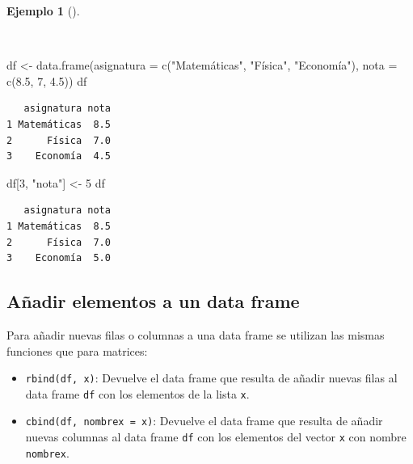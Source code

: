 \documentclass[
  spanish,
  a4paper,
]{scrreport}
\newenvironment{Shaded}{\begin{snugshade}}{\end{snugshade}}
\newcommand{\AttributeTok}[1]{\textcolor[rgb]{0.40,0.45,0.13}{#1}}
\newcommand{\DecValTok}[1]{\textcolor[rgb]{0.68,0.00,0.00}{#1}}
\newcommand{\FloatTok}[1]{\textcolor[rgb]{0.68,0.00,0.00}{#1}}
\newcommand{\FunctionTok}[1]{\textcolor[rgb]{0.28,0.35,0.67}{#1}}
\newcommand{\NormalTok}[1]{\textcolor[rgb]{0.00,0.23,0.31}{#1}}
\newcommand{\OtherTok}[1]{\textcolor[rgb]{0.00,0.23,0.31}{#1}}
\newcommand{\StringTok}[1]{\textcolor[rgb]{0.13,0.47,0.30}{#1}}
\theoremstyle{definition}
\theoremstyle{definition}
\newtheorem{example}{Ejemplo}[chapter]
\theoremstyle{remark}
\begin{document}
\begin{example}[]\protect\hypertarget{exm-modificacion-data-frames}{}\label{exm-modificacion-data-frames}

~

\begin{Shaded}
\begin{Highlighting}[]
\NormalTok{df }\OtherTok{\textless{}{-}} \FunctionTok{data.frame}\NormalTok{(}\AttributeTok{asignatura =} \FunctionTok{c}\NormalTok{(}\StringTok{"Matemáticas"}\NormalTok{, }\StringTok{"Física"}\NormalTok{, }\StringTok{"Economía"}\NormalTok{), }\AttributeTok{nota =} \FunctionTok{c}\NormalTok{(}\FloatTok{8.5}\NormalTok{, }\DecValTok{7}\NormalTok{, }\FloatTok{4.5}\NormalTok{))}
\NormalTok{df}
\end{Highlighting}
\end{Shaded}

\begin{verbatim}
   asignatura nota
1 Matemáticas  8.5
2      Física  7.0
3    Economía  4.5
\end{verbatim}

\begin{Shaded}
\begin{Highlighting}[]
\NormalTok{df[}\DecValTok{3}\NormalTok{, }\StringTok{"nota"}\NormalTok{] }\OtherTok{\textless{}{-}} \DecValTok{5}
\NormalTok{df}
\end{Highlighting}
\end{Shaded}

\begin{verbatim}
   asignatura nota
1 Matemáticas  8.5
2      Física  7.0
3    Economía  5.0
\end{verbatim}

\end{example}

\subsection{Añadir elementos a un data
frame}\label{auxf1adir-elementos-a-un-data-frame}

Para añadir nuevas filas o columnas a una data frame se utilizan las
mismas funciones que para matrices:

\begin{itemize}
\item
  \texttt{rbind(df,\ x)}: Devuelve el data frame que resulta de añadir
  nuevas filas al data frame \texttt{df} con los elementos de la lista
  \texttt{x}.
\item
  \texttt{cbind(df,\ nombrex\ =\ x)}: Devuelve el data frame que resulta
  de añadir nuevas columnas al data frame \texttt{df} con los elementos
  del vector \texttt{x} con nombre \texttt{nombrex}.
\end{itemize}
\end{document}
